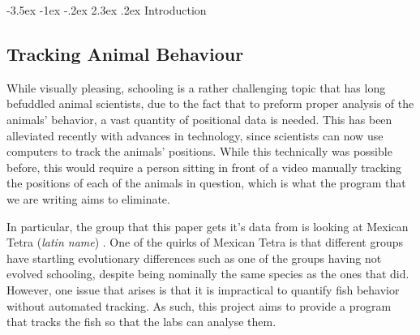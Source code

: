 \documentclass{article}
\makeatletter
\renewcommand\section{\clearpage\newpage\@startsection {section}{1}{\z@}%
	{-3.5ex \@plus -1ex \@minus -.2ex}%
	{2.3ex \@plus.2ex}%
	{\normalfont\Large\bfseries}}
\makeatother
\begin{document}
\singlespace
\newpage

\setlength{\parindent}{1em}



\section{Introduction}

\subsection{Tracking Animal Behaviour}
While visually pleasing, schooling is a rather challenging topic that has long befuddled animal scientists, due to the fact that to preform proper analysis of the animals' behavior, a vast quantity of positional data is needed. This has been alleviated recently with advances in technology, since scientists can now use computers to track the animals' positions. While this technically was possible before, this would require a person sitting in front of a video manually tracking the positions of each of the animals in question, which is what the program that we are writing aims to eliminate.

In particular, the group that this paper gets it's data from is looking at Mexican Tetra (\textit{latin name}) \cite{fishPaper}. One of the quirks of Mexican Tetra is that different groups have startling evolutionary differences such as one of the groups having not evolved schooling, despite being nominally the same species as the ones that did. However, one issue that arises is that it is impractical to quantify fish behavior without automated tracking. As such, this project aims to provide a program that tracks the fish so that the labs can analyse them.
\end{document}
